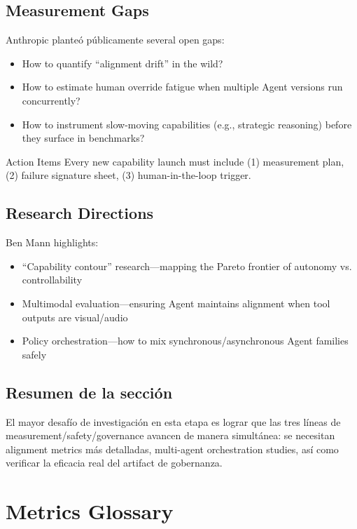 \documentclass[a4paper]{article}
\begin{document}
\subsection{Measurement Gaps}

Anthropic planteó públicamente several open gaps:

\begin{itemize}
    \item How to quantify ``alignment drift'' in the wild?
    \item How to estimate human override fatigue when multiple Agent versions run concurrently?
    \item How to instrument slow-moving capabilities (e.g., strategic reasoning) before they surface in benchmarks?
\end{itemize}

\begin{knowledgebox}{Action Items}
Every new capability launch must include (1) measurement plan, (2) failure signature sheet, (3) human-in-the-loop trigger.
\end{knowledgebox}

\subsection{Research Directions}

Ben Mann highlights:

\begin{itemize}
    \item ``Capability contour'' research—mapping the Pareto frontier of autonomy vs. controllability
    \item Multimodal evaluation—ensuring Agent maintains alignment when tool outputs are visual/audio
    \item Policy orchestration—how to mix synchronous/asynchronous Agent families safely
\end{itemize}

\subsection{Resumen de la sección}

El mayor desafío de investigación en esta etapa es lograr que las tres líneas de measurement/safety/governance avancen de manera simultánea: se necesitan alignment metrics más detalladas, multi-agent orchestration studies, así como verificar la eficacia real del artifact de gobernanza.

\section{Metrics Glossary}
\end{document}
